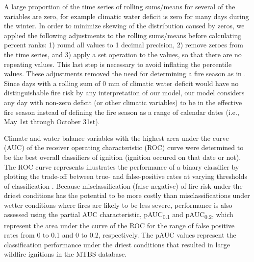 \documentclass[11pt]{article}
\newcommand{\pauc}[1]{pAUC\textsubscript{#1}}
\begin{document}
A large proportion of the time series of rolling sums/means for several of the variables are zero, for example climatic water deficit is zero for many days during the winter.  %
In order to minimize skewing of the distribution caused by zeros, we applied the following adjustments to the rolling sums/means before calculating percent ranks: 1) round all values to 1 decimal precision, 2) remove zeroes from the time series, and 3) apply a set operation to the values, so that there are no repeating values.  This last step is necessary to avoid inflating the percentile values. These adjustments %
removed the need for determining a fire season as in \citet{thomaWaterBalanceIndicator2020}.  Since days with a rolling sum of 0 mm of climatic water deficit would have no distinguishable fire risk by any interpretation of our model, our model considers any day with non-zero deficit (or other climatic variables) to be in the effective fire season instead of defining the fire season as a range of calendar dates (i.e., May 1st through October 31st).

Climate and water balance variables with the highest area under the curve (AUC) of the receiver operating characteristic (ROC) curve were determined to be the best overall classifiers of ignition (ignition occured on that date or not).  The ROC curve represents illustrates the performance of a binary classifier by plotting the trade-off between true- and false-positive rates at varying thresholds of classification \citep{pontiusRecommendationsUsingRelative2014}. Because misclassification (false negative) of fire risk under the driest conditions has the potential to be more costly than misclassifications under wetter conditions where fires are likely to be less severe, performance is also assessed using the partial AUC characteristic, \pauc{0.1} and \pauc{0.2}, which represent the area under the curve of the ROC for the range of false positive rates from 0 to 0.1 and 0 to 0.2, respectively. The pAUC values represent the classification performance under the driest conditions that resulted in large wildfire ignitions in the MTBS database.   
\end{document}
